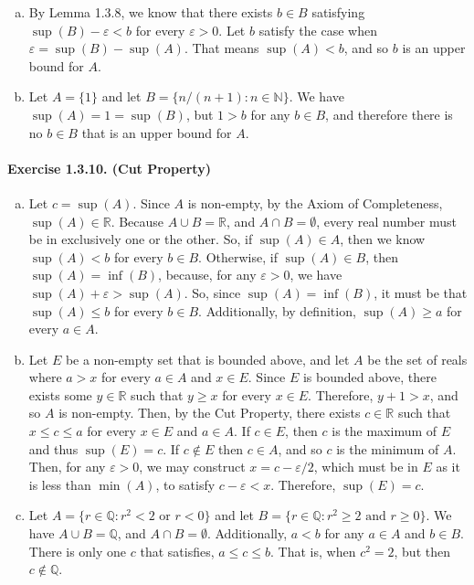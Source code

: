\documentclass{article}
\newcommand{\N}{\mathbb{N}}
\newcommand{\R}{\mathbb{R}}
\newcommand{\Q}{\mathbb{Q}}
\begin{document}
\begin{enumerate}[(a)]
    \item By Lemma 1.3.8, we know that there exists $b \in B$ satisfying $\sup(B) - \varepsilon < b$ for every $\varepsilon > 0$. Let $b$ satisfy the case when $\varepsilon = \sup(B) - \sup(A)$. That means $\sup(A) < b$, and so $b$ is an upper bound for $A$.
    \item Let $A=\{1\}$ and let $B=\{n/(n+1): n\in \N\}$. We have $\sup(A)=1=\sup(B)$, but $1 > b$ for any $b\in B$, and therefore there is no $b\in B $ that is an upper bound for $A$.
\end{enumerate}

\paragraph{Exercise 1.3.10. (Cut Property)}
\begin{enumerate}[(a)]
    \item Let $c=\sup(A)$. Since $A$ is non-empty, by the Axiom of Completeness, $\sup(A) \in \R$. Because $A\cup B = \R$, and $A \cap B = \emptyset$, every real number must be in exclusively one or the other. So, if $\sup(A) \in A$, then we know $\sup(A) < b$ for every $b \in B$. Otherwise, if $\sup(A) \in B$, then $\sup(A) = \inf(B)$, because, for any $\varepsilon > 0$, we have $\sup(A) + \varepsilon > \sup(A)$. So, since $\sup(A) = \inf(B)$, it must be that $\sup(A) \leq b$ for every $b\in B$. Additionally, by definition, $\sup(A) \geq a$ for every $a\in A$.
    \item Let $E$ be a non-empty set that is bounded above, and let $A$ be the set of reals where $a > x$ for every $a\in A$ and $x\in E$. Since $E$ is bounded above, there exists some $y \in \R$ such that $y \geq x$ for every $x \in E$. Therefore, $y+1 > x$, and so $A$ is non-empty. Then, by the Cut Property, there exists $c \in \R$ such that $x \leq c \leq a$ for every $x \in E$ and $a \in A$. If $c\in E$, then $c$ is the maximum of $E$ and thus $\sup(E)=c$. If $c\notin E$ then $c\in A$, and so $c$ is the minimum of $A$. Then, for any $\varepsilon > 0$, we may construct $x = c-\varepsilon/2$, which must be in $E$ as it is less than $\min(A)$, to satisfy $c - \varepsilon < x$. Therefore, $\sup(E) = c$.
    \item Let $A = \{r \in \Q : r^2 < 2 \text{ or } r < 0 \}$ and let $B = \{r \in \Q : r^2 \geq 2 \text { and } r \geq 0\}$. We have $A \cup B = \Q$, and $A \cap B = \emptyset$. Additionally, $a < b$ for any $a \in A$ and $b \in B$. There is only one $c$ that satisfies, $a \leq c \leq b$. That is, when $c^2 = 2$, but then $c \notin \Q$.
\end{enumerate}
\end{document}
